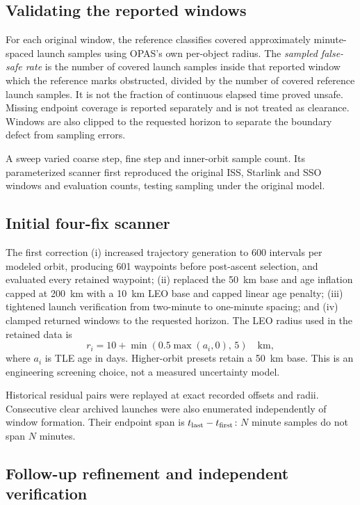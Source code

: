 \documentclass[11pt,a4paper]{article}
\begin{document}
\subsection{Validating the reported windows}

For each original window, the reference classifies covered approximately
minute-spaced launch samples using OPAS's own per-object radius. The
\emph{sampled false-safe rate} is the number of covered launch samples
inside that reported window which the reference marks obstructed, divided
by the number of covered reference launch samples. It is not the fraction
of continuous elapsed time proved unsafe. Missing endpoint coverage is
reported separately and is not treated as clearance. Windows are also
clipped to the requested horizon to separate the boundary defect from
sampling errors.

A sweep varied coarse step, fine step and inner-orbit sample count. Its
parameterized scanner first reproduced the original ISS, Starlink and SSO
windows and evaluation counts, testing sampling under the original model.

\subsection{Initial four-fix scanner}
\label{sec:initial-method}

The first correction (i) increased trajectory generation to 600 intervals
per modeled orbit, producing 601 waypoints before post-ascent selection,
and evaluated every retained waypoint; (ii) replaced the 50~km base and
age inflation capped at 200~km with a 10~km LEO base and capped linear
age penalty; (iii) tightened launch verification from two-minute to
one-minute spacing; and (iv) clamped returned windows to the requested
horizon. The LEO radius used in the retained data is
\begin{equation}
  r_i = 10 + \min\!\left(0.5\max(a_i,0),\,5\right)\quad\mathrm{km},
  \label{eq:radius}
\end{equation}
where $a_i$ is TLE age in days. Higher-orbit presets retain a 50~km base.
This is an engineering screening choice, not a measured uncertainty model.

Historical residual pairs were replayed at exact recorded offsets and
radii. Consecutive clear archived launches were also enumerated independently
of window formation. Their endpoint span is $t_{\rm last}-t_{\rm first}$:
$N$ minute samples do not span $N$ minutes.

\subsection{Follow-up refinement and independent verification}
\label{sec:followup-method}
\end{document}
